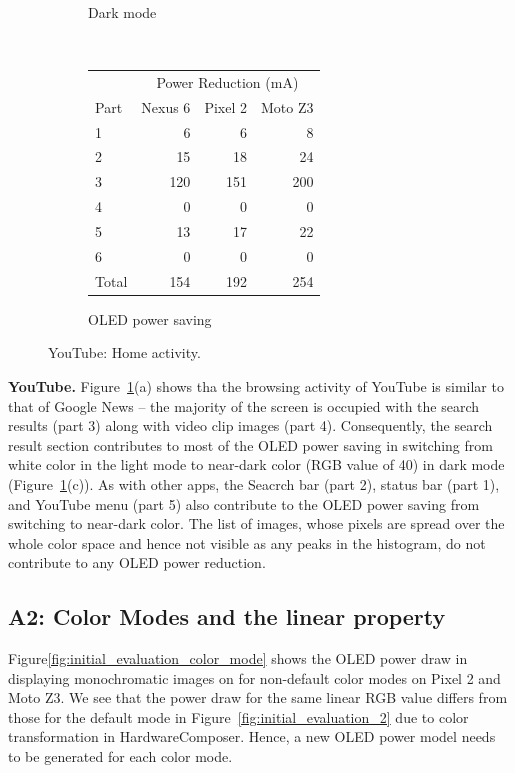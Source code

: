 \begin{figure}[h]
\begin{subfigure}[]{\columnwidth}
		\caption{Dark mode}
	\end{subfigure}
	\\
	\begin{subfigure}[]{\columnwidth}
	\centering
	{ \small
	\begin{tabular}{ | l | r | r | r | }
		\hline
		     & \multicolumn{3}{|c|}{Power Reduction (mA)}\\
		\cline{2-4}
                Part & Nexus 6 & Pixel 2 & Moto Z3 \\
		\hline
		1 &   6 &     6 &    8  \\
		2 &  15 &    18 &   24  \\
		3 & 120 &   151 &  200  \\
		4 &   0 &     0 &    0  \\
		5 &  13 &    17 &   22  \\
		6 &   0 &     0 &    0  \\
		\hline
		Total   & 154 & 192 & 254  \\
		\hline
	\end{tabular}
	}
	\caption{OLED power saving}		
        \vspace{-0.1in}
	\end{subfigure}
	\caption{YouTube: Home activity.}
	\label{fig:case_study_youtube}
\end{figure}

{\bf YouTube.}  Figure~\ref{fig:case_study_youtube}(a) shows tha the
browsing activity of YouTube is similar to that of Google News -- the
majority of the screen is occupied with the search results (part 3)
along with video clip images (part 4).  Consequently, the search
result section contributes to most of the OLED power saving in
switching from white color in the light mode to near-dark color (RGB
value of 40) in dark mode
(Figure~\ref{fig:case_study_youtube}(c)).  As with other
apps, the Seacrch bar (part 2), status bar (part 1), and
YouTube menu (part 5) also contribute to the OLED power saving from
switching to near-dark color. The list of images, whose pixels are
spread over the whole color space and hence not visible as any peaks in
the histogram, do not contribute to any OLED power reduction.


\subsection*{A2: Color Modes and the linear property}

Figure\ref{fig:initial_evaluation_color_mode}
shows the OLED power draw in displaying monochromatic images on
for non-default color modes on Pixel 2 and Moto Z3.
We see that the power draw for the same linear RGB value differs from
those for the default mode in Figure~\ref{fig:initial_evaluation_2}
due to color transformation in HardwareComposer.
Hence, a new OLED power model needs to be generated for each color mode.

